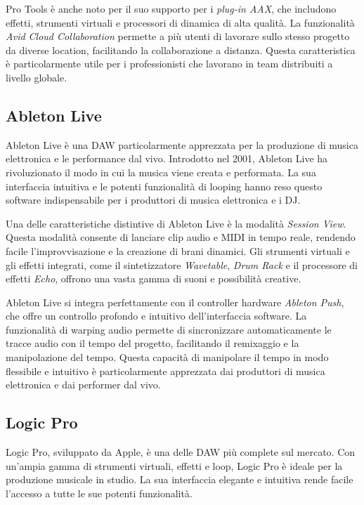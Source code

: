 \documentclass{book}
\begin{document}
Pro Tools è anche noto per il suo supporto per i \textit{plug-in AAX}, che includono effetti, strumenti virtuali e processori di dinamica di alta qualità. La funzionalità \textit{Avid Cloud Collaboration} permette a più utenti di lavorare sullo stesso progetto da diverse location, facilitando la collaborazione a distanza. Questa caratteristica è particolarmente utile per i professionisti che lavorano in team distribuiti a livello globale.

\subsection{Ableton Live}

Ableton Live è una DAW particolarmente apprezzata per la produzione di musica elettronica e le performance dal vivo. Introdotto nel 2001, Ableton Live ha rivoluzionato il modo in cui la musica viene creata e performata. La sua interfaccia intuitiva e le potenti funzionalità di looping hanno reso questo software indispensabile per i produttori di musica elettronica e i DJ.

Una delle caratteristiche distintive di Ableton Live è la modalità \textit{Session View}. Questa modalità consente di lanciare clip audio e MIDI in tempo reale, rendendo facile l’improvvisazione e la creazione di brani dinamici. Gli strumenti virtuali e gli effetti integrati, come il sintetizzatore \textit{Wavetable}, \textit{Drum Rack} e il processore di effetti \textit{Echo}, offrono una vasta gamma di suoni e possibilità creative.

Ableton Live si integra perfettamente con il controller hardware \textit{Ableton Push}, che offre un controllo profondo e intuitivo dell’interfaccia software. La funzionalità di warping audio permette di sincronizzare automaticamente le tracce audio con il tempo del progetto, facilitando il remixaggio e la manipolazione del tempo. Questa capacità di manipolare il tempo in modo flessibile e intuitivo è particolarmente apprezzata dai produttori di musica elettronica e dai performer dal vivo.

\subsection{Logic Pro}

Logic Pro, sviluppato da Apple, è una delle DAW più complete sul mercato. Con un’ampia gamma di strumenti virtuali, effetti e loop, Logic Pro è ideale per la produzione musicale in studio. La sua interfaccia elegante e intuitiva rende facile l’accesso a tutte le sue potenti funzionalità.
\end{document}
